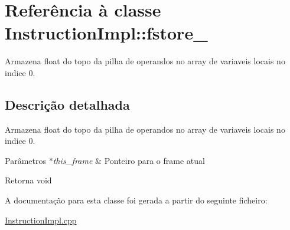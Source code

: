 \hypertarget{class_instruction_impl_1_1fstore__0}{}\section{Referência à classe Instruction\+Impl\+:\+:fstore\+\_}
\label{class_instruction_impl_1_1fstore__0}


Armazena float do topo da pilha de operandos no array de variaveis locais no indice 0.  




\subsection{Descrição detalhada}
Armazena float do topo da pilha de operandos no array de variaveis locais no indice 0. 


\begin{DoxyParams}{Parâmetros}
{\em $\ast$this\+\_\+frame} & Ponteiro para o frame atual \\
\hline
\end{DoxyParams}
\begin{DoxyReturn}{Retorna}
void 
\end{DoxyReturn}


A documentação para esta classe foi gerada a partir do seguinte ficheiro\+:\begin{DoxyCompactItemize}
\item 
\hyperlink{_instruction_impl_8cpp}{Instruction\+Impl.\+cpp}\end{DoxyCompactItemize}
